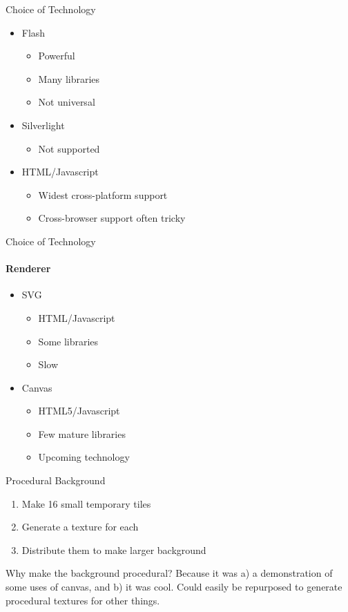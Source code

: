 \begin{frame}{Choice of Technology}
  \begin{itemize}
    \item Flash
      \begin{itemize}
        \item Powerful
        \item Many libraries
        \item Not universal
      \end{itemize}
    \item Silverlight
      \begin{itemize}
        \item Not supported
      \end{itemize}
    \item HTML/Javascript
      \begin{itemize}
        \item Widest cross-platform support
        \item Cross-browser support often tricky
      \end{itemize}
  \end{itemize}
\end{frame}

\begin{frame}{Choice of Technology}
  \framesubtitle{Renderer}
  \begin{itemize}
    \item SVG
      \begin{itemize}
        \item HTML/Javascript
        \item Some libraries
        \item Slow
      \end{itemize}
    \item Canvas
      \begin{itemize}
        \item HTML5/Javascript
        \item Few mature libraries
        \item Upcoming technology
      \end{itemize}
  \end{itemize}
\end{frame}

\begin{frame}{Procedural Background}
  \begin{enumerate}
    \item Make 16 small temporary tiles
    \item Generate a texture for each
    \item Distribute them to make larger background
  \end{enumerate}
\end{frame}
\begin{flushleft}
  Why make the background procedural? Because it was a) a demonstration of some uses of canvas, and b) it was cool.
  Could easily be repurposed to generate procedural textures for other things.
\end{flushleft}

